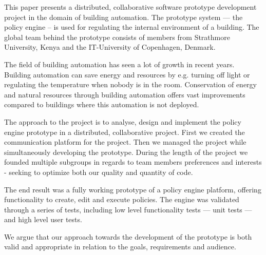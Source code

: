 This paper presents a distributed, collaborative software prototype development project in the domain of building automation. The prototype system --- the policy engine -- is used for regulating the internal environment of a building. The global team behind the prototype consists of members from Strathmore University, Kenya and the IT-University of Copenhagen, Denmark. 

The field of building automation has seen a lot of growth in recent years. Building automation can save energy and resources by e.g. turning off light or regulating the temperature when nobody is in the room. Conservation of energy and natural resources through building automation offers vast improvements compared to buildings where this automation is not deployed. 

The approach to the project is to analyse, design and implement the policy engine prototype in a distributed, collaborative project. First we created the communication platform for the project. Then we managed the project while simultaneously developing the prototype. During the length of the project we founded multiple subgroups in regards to team members preferences and interests - seeking to optimize both our quality and quantity of code.

The end result was a fully working prototype of a policy engine platform, offering functionality to create, edit and execute policies. The engine was validated through a series of tests, including low level functionality tests --- unit tests --- and high level user tests. 

We argue that our approach towards the development of the prototype is both valid and appropriate in relation to the goals, requirements and audience.